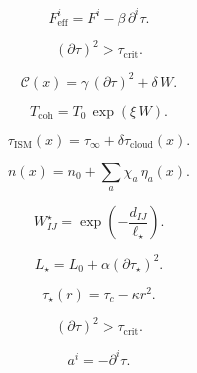 \[
F^i_{\mathrm{eff}} = F^i - \beta\,\partial^i\tau.
\]

\[
(\partial\tau)^2 > \tau_{\mathrm{crit}}.
\]

\[
\mathcal{C}(x)=\gamma\,(\partial\tau)^2 + \delta\,W.
\]

\[
T_{\mathrm{coh}} = T_0\,\exp(\xi\, W).
\]

\[
\tau_{\mathrm{ISM}}(x) = \tau_\infty + \delta\tau_{\mathrm{cloud}}(x).
\]

\[
n(x) = n_0 + \sum_a \chi_a\,\eta_a(x).
\]

\[
W_{IJ}^{\star} = \exp\!\left(-\frac{d_{IJ}}{\ell_\star}\right).
\]

\[
L_\star = L_0 + \alpha (\partial\tau_\star)^2.
\]

\[
\tau_\star(r) = \tau_c - \kappa r^2.
\]

\[
(\partial\tau)^2 > \tau_{\mathrm{crit}}.
\]

\[
a^i = -\partial^i\tau.
\]

